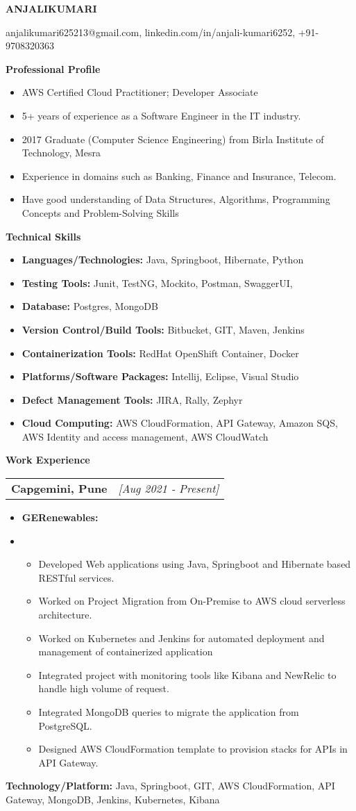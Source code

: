 \documentclass[a4paper,10pt]{article}
\makeatletter
\newcommand{\resitem}[1]{\item #1}
\newcommand{\resheading}[1]{\vspace{0.5em} {\small \colorbox{mygrey}{{\begin{minipage}{0.975\textwidth}{{\textbf{#1}}}\end{minipage}}}} \vspace{0.5em}}
\newcommand{\ressubheading}[3]{\begin{tabular*}{6.62in}{l @{\extracolsep{\fill}} r} \textbf{#1} & \textit{[#2]} \\ \end{tabular*}\vspace{-8pt}}
\makeatother
\begin{document}
\begin{center} \Large{\textbf{ANJALIKUMARI}} \end{center}

\vspace{2pt}

\begin{center} anjalikumari625213@gmail.com, linkedin.com/in/anjali-kumari6252, +91-9708320363 \end{center}

\resheading{Professional Profile}
\begin{itemize}[nosep]
    \resitem{AWS Certified Cloud Practitioner; Developer Associate}
    \resitem{5+ years of experience as a Software Engineer in the IT industry.}
    \resitem{2017 Graduate (Computer Science Engineering) from Birla Institute of Technology, Mesra}
    \resitem{Experience in domains such as Banking, Finance and Insurance, Telecom.}
    \resitem{Have good understanding of Data Structures, Algorithms, Programming Concepts and Problem-Solving Skills}
\end{itemize}

\resheading{Technical Skills}
\begin{itemize}[nosep]
    \resitem{\textbf{Languages/Technologies:} Java, Springboot, Hibernate, Python}
    \resitem{\textbf{Testing Tools:} Junit, TestNG, Mockito, Postman, SwaggerUI,}
    \resitem{\textbf{Database:} Postgres, MongoDB}
    \resitem{\textbf{Version Control/Build Tools:} Bitbucket, GIT, Maven, Jenkins}
    \resitem{\textbf{Containerization Tools:} RedHat OpenShift Container, Docker}
    \resitem{\textbf{Platforms/Software Packages:} Intellij, Eclipse, Visual Studio}
    \resitem{\textbf{Defect Management Tools:} JIRA, Rally, Zephyr}
    \resitem{\textbf{Cloud Computing:} AWS CloudFormation, API Gateway, Amazon SQS, AWS Identity and access management, AWS CloudWatch}
\end{itemize}

\resheading{Work Experience}
\ressubheading{Capgemini, Pune}{Aug 2021 - Present}{Senior Consultant}
\begin{itemize}[nosep]
    \resitem{\textbf{GERenewables:}}
    \resitem{\begin{itemize}
        \item Developed Web applications using Java, Springboot and Hibernate based RESTful services.
        \item Worked on Project Migration from On-Premise to AWS cloud serverless architecture.
        \item Worked on Kubernetes and Jenkins for automated deployment and management of containerized application
        \item Integrated project with monitoring tools like Kibana and NewRelic to handle high volume of request.
        \item Integrated MongoDB queries to migrate the application from PostgreSQL.
        \item Designed AWS CloudFormation template to provision stacks for APIs in API Gateway.
    \end{itemize}}
\end{itemize}
\textbf{Technology/Platform:} Java, Springboot, GIT, AWS CloudFormation, API Gateway, MongoDB, Jenkins, Kubernetes, Kibana
\end{document}

